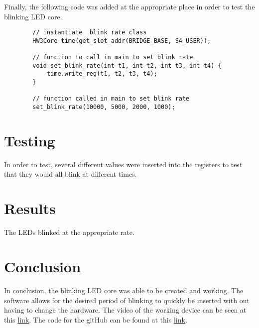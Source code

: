\documentclass[12pt]{article}
\begin{document}
	Finally, the following code was added at the appropriate place in order to test the blinking LED core.
	
	\begin{lstlisting}
		// instantiate  blink rate class
		HW3Core time(get_slot_addr(BRIDGE_BASE, S4_USER));
		
		// function to call in main to set blink rate
		void set_blink_rate(int t1, int t2, int t3, int t4) {
			time.write_reg(t1, t2, t3, t4);
		}
		
		// function called in main to set blink rate
		set_blink_rate(10000, 5000, 2000, 1000);
	\end{lstlisting}
	\section{Testing}
	In order to test, several different values were inserted into the registers to test that they would all blink at different times.
	
	
	\section{Results}
	The LEDs blinked at the appropriate rate.
	
	\section{Conclusion}
	In conclusion, the blinking LED core was able to be created and working. The software allows for the desired period of blinking to quickly be inserted with out having to change the hardware. The video of the working device can be seen at this \href{https://www.youtube.com/watch?v=IYFFpxjsxYw}{link}. 
	The code for the gitHub can be found at this \href {https://github.com/andrew-clinkenbeard/Blinking-Led-Core} {link}.
	
	
\end{document}
